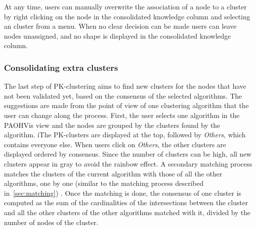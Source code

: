 \begin{description}[leftmargin=0pt,nosep]

\item [Direct tagging.] At any time, users can manually overwrite the association of a node to a cluster by right clicking on the node in the consolidated knowledge column and selecting an cluster from a menu.
When no clear decision can be made users can leave nodes unassigned, and no shape is displayed in the consolidated knowledge column.
\end{description}



\subsubsection{Consolidating extra clusters}

The last step of PK-clustering aims to find new clusters for the nodes that have not been validated yet, based on the consensus of the selected algorithms. The suggestions are made from the point of view of one clustering algorithm that the user can change along the process.
First, the user selects one algorithm in the PAOHVis view and the nodes are grouped by the clusters found by the algorithm.
iThe PK-clusters are displayed at the top, followed by \emph{Others}, which contains everyone else. When users click on \emph{Others}, the other clusters are displayed ordered by consensus. Since the number of clusters can be high, all new clusters appear in gray to avoid the rainbow effect. A secondary matching process matches the clusters of the current algorithm with those of all the other algorithms, one by one (similar to the matching process described in~\autoref{sec:matching}) . Once the matching is done, the consensus of one cluster is computed as the sum of the cardinalities of the intersections between the cluster and all the other clusters of the other algorithms matched with it, divided by the number of nodes of the cluster.

